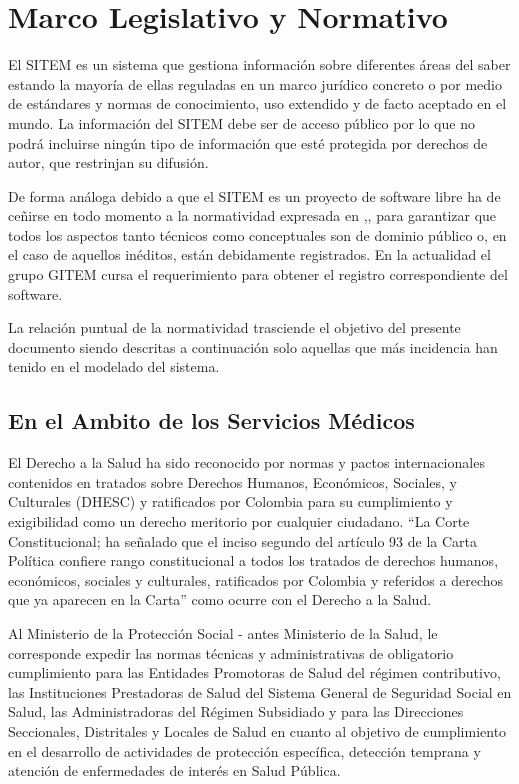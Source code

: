 \section{Marco Legislativo y Normativo}

El SITEM es un sistema que gestiona información sobre diferentes áreas del saber estando la mayoría de ellas reguladas en un marco jurídico concreto o por medio de estándares y normas de conocimiento, uso extendido y de facto aceptado en el mundo. La información del SITEM debe ser de acceso público por lo que no podrá incluirse ningún tipo de información que esté protegida por derechos de autor\cite{congreso565},\cite{congreso23} que restrinjan su difusión. 

De forma análoga debido a que el SITEM es un proyecto de software libre ha de ceñirse en todo momento a la normatividad expresada en \cite{congreso565},\cite{congreso44},\cite{congreso1360} para garantizar que todos los aspectos tanto técnicos como conceptuales son de dominio público o, en el caso de aquellos inéditos, están debidamente registrados. En la actualidad el grupo GITEM cursa el requerimiento para obtener el registro correspondiente del software. 

La relación puntual de la normatividad trasciende el objetivo del presente documento siendo descritas a continuación solo aquellas que más incidencia han tenido en el modelado del sistema.

\subsection{En el Ambito de los Servicios Médicos}

El Derecho a la Salud ha sido reconocido por normas y pactos internacionales contenidos en tratados sobre Derechos Humanos, Económicos, Sociales,  y Culturales  (DHESC) y ratificados por Colombia para su  cumplimiento y exigibilidad como un derecho meritorio por cualquier ciudadano. “La Corte Constitucional; ha señalado que el inciso segundo del artículo 93 de la Carta Política confiere rango constitucional a todos los tratados de derechos humanos, económicos,  sociales y culturales, ratificados por Colombia y referidos a derechos que ya aparecen en la Carta”\cite{sentencia1319} como ocurre con el Derecho a la Salud. 

Al Ministerio de la Protección Social - antes Ministerio de la Salud, le corresponde expedir las normas técnicas y administrativas de obligatorio cumplimiento para las Entidades Promotoras de Salud del régimen contributivo, las Instituciones Prestadoras de Salud del Sistema General de Seguridad Social en Salud, las Administradoras del Régimen Subsidiado y para las Direcciones Seccionales, Distritales y Locales de Salud en cuanto al objetivo de cumplimiento en el desarrollo de actividades de protección específica, detección temprana y atención de enfermedades de interés en Salud Pública. 

